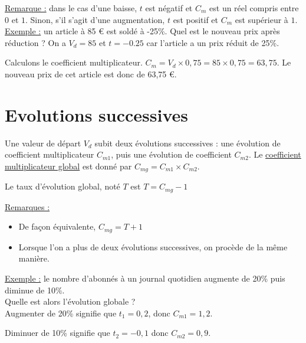 \documentclass[french]{book}
\begin{document}
\underline{Remarque :} dans le cas d’une baisse, $t$ est négatif et $C_m$ est un réel compris entre $0$ et $1$. Sinon, s’il s’agit d’une augmentation, $t$ est positif et $C_m$ est supérieur à $1$.\\

\underline{Exemple :} un article à 85 \euro{} est soldé à -25\%. Quel est le nouveau prix après réduction ?
On a $V_d=85$ et $t=-0.25$ car l'article a un prix réduit de 25\%.

Calculons le coefficient multiplicateur. $C_m= V_d \times 0,75 = 85 \times 0,75 = 63,75$. Le nouveau prix de cet article est donc de 63,75 \euro{}.

\newpage

    \section{Evolutions successives} 



\begin{prop} Une valeur de départ $V_d$ subit deux évolutions successives : une évolution de coefficient multiplicateur $C_{m1}$, puis une évolution de coefficient $C_{m2}$.
Le \underline{coefficient multiplicateur global} est donné par $C_{mg}=C_{m1} \times C_{m2}$.
\end{prop}

\begin{defn}
Le taux d’évolution global, noté $T$ est $T=C_{mg}-1$
\vspace{5mm}
\end{defn}

\underline{Remarques :}
\begin{itemize}
 \item[$\bullet$] De façon équivalente, $C_{mg}=T+1$
 \item[$\bullet$] Lorsque l’on a plus de deux évolutions successives, on procède de la même manière.	
\end{itemize}

\underline{Exemple :} le nombre d’abonnés à un journal quotidien augmente de 20\% puis diminue de 10\%.  \\

Quelle est alors l’évolution globale ?\\

Augmenter de 20\% signifie que $t_1=0,2$, donc $C_{m1}=1,2$.

Diminuer de 10\% signifie que $t_2=-0,1$ donc $C_{m2}=0,9$.\\
\end{document}
